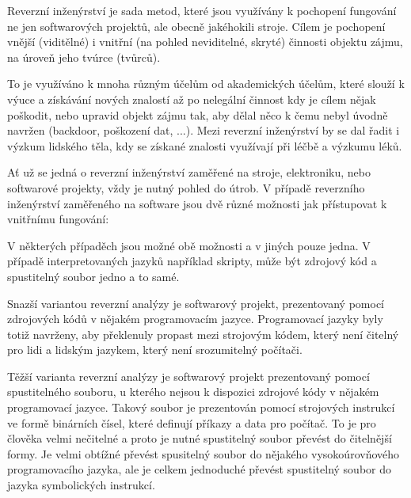 

%






Reverzní inženýrství je sada metod, které jsou využívány k pochopení fungování ne jen softwarových projektů, ale obecně jakéhokili stroje. Cílem je pochopení vnější (viditělné) i vnitřní (na pohled neviditelné, skryté) činnosti objektu zájmu, na úroveň jeho tvúrce (tvůrců). 

To je využíváno k mnoha různým účelům od akademických účelům, které slouží k výuce a získávání nových znalostí až po nelegální činnost kdy je cílem nějak poškodit, nebo upravid objekt zájmu tak, aby dělal něco k čemu nebyl úvodně navržen (backdoor, poškození dat, ...). Mezi reverzní inženýrství by se dal řadit i výzkum lidského těla, kdy se získané znalosti využívají při léčbě a výzkumu léků.


Ať už se jedná o reverzní inženýrství zaměřené na stroje, elektroniku, nebo softwarové projekty, vždy je nutný pohled do útrob. V případě reverzního inženýrství zaměřeného na software jsou dvě různé možnosti jak přístupovat k vnitřnímu fungování:

\vskip 4mm
\vskip 4mm

V některých případěch jsou možné obě možnosti a v jiných pouze jedna. V případě interpretovaných jazyků například skripty, může být zdrojový kód a spustitelný soubor jedno a to samé.


Snazší variantou reverzní analýzy je softwarový projekt, prezentovaný pomocí zdrojových kódů v nějakém programovacím jazyce. Programovací jazyky byly totiž navrženy, aby překlenuly propast mezi strojovým kódem, který není čitelný pro lidi a lidským jazykem, který není srozumitelný počítači.


Těžší varianta reverzní analýzy je softwarový projekt prezentovaný pomocí spustitelného souboru, u kterého nejsou k dispozici zdrojové kódy v nějakém programovací jazyce. Takový soubor je prezentován pomocí strojových instrukcí ve formě binárních čísel, které definují příkazy a data pro počítač. To je pro člověka velmi nečitelné a proto je nutné spustitelný soubor převést do čitelnější formy. Je velmi obtížné převést spusitelný soubor do nějakého vysokoúrovňového programovacího jazyka, ale je celkem jednoduché převést spustitelný soubor do jazyka symbolických instrukcí. 

